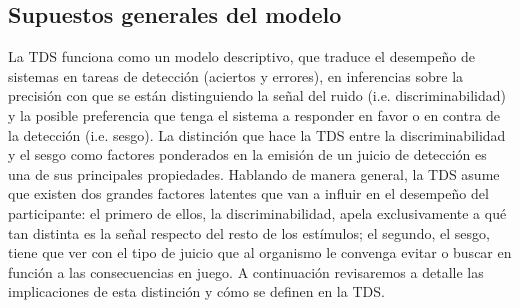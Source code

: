 \subsection{Supuestos generales del modelo}

La TDS funciona como un modelo descriptivo, que traduce el desempeño de sistemas en tareas de detección (aciertos y errores), en inferencias sobre la precisión con que se están distinguiendo la señal del ruido (i.e. discriminabilidad) y la posible preferencia que tenga el sistema a responder en favor o en contra de la detección (i.e. sesgo). La distinción que hace la TDS entre la discriminabilidad y el sesgo como factores ponderados en la emisión de un juicio de detección es una de sus principales propiedades. Hablando de manera general, la TDS asume que existen dos grandes factores latentes que van a influir en el desempeño del participante: el primero de ellos, la discriminabilidad, apela exclusivamente a qué tan distinta es la señal respecto del resto de los estímulos; el segundo, el sesgo, tiene que ver con el tipo de juicio que al organismo le convenga evitar o buscar en función a las consecuencias en juego. A continuación revisaremos a detalle las implicaciones de esta distinción y cómo se definen en la TDS.\\


